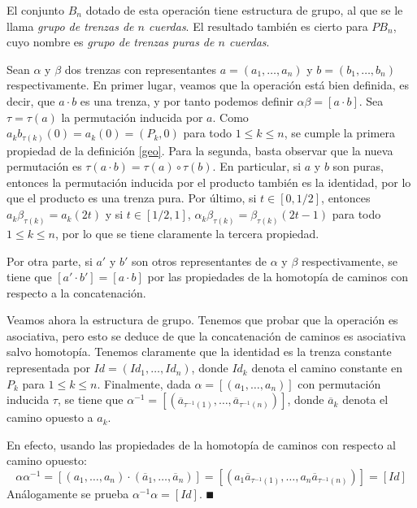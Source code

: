 \documentclass[TFG.tex]{subfiles}
\begin{document}
\begin{prop}
El conjunto $B_n$ dotado de esta operación tiene estructura de grupo, al que se le llama \emph{grupo de trenzas de $n$ cuerdas}. El resultado también es cierto para $PB_n$, cuyo nombre es \emph{grupo de trenzas puras de $n$ cuerdas}. 
\end{prop}

\begin{dem}
Sean $\alpha$ y $\beta$ dos trenzas con representantes $a=(a_1,\dots, a_n)$ y $b=(b_1,\dots, b_n)$ respectivamente. En primer lugar, veamos que la operación está bien definida, es decir, que $a\cdot b$ es una trenza, y por tanto podemos definir $\alpha\beta=[a\cdot b]$. Sea $\tau=\tau(a)$ la permutación inducida por $a$. Como $a_kb_{\tau(k)}(0)=a_k(0)=(P_k,0)$ para todo $1\leq k\leq n$, se cumple la primera propiedad de la definición \ref{geo}. Para la segunda, basta observar que la nueva permutación es $\tau(a\cdot b)=\tau(a)\circ \tau(b)$. En particular, si $a$ y $b$ son puras, entonces la permutación inducida por el producto también es la identidad, por lo que el producto es una trenza pura. Por último, si $t\in[0,1/2]$, entonces $a_k\beta_{\tau(k)}=a_k(2t)$ y si $t\in [1/2,1]$, $\alpha_k\beta_{\tau(k)}=\beta_{\tau(k)}(2t-1)$ para todo $1\leq k\leq n$, por lo que se tiene claramente la tercera propiedad. 

Por otra parte, si $a'$ y $b'$ son otros representantes de $\alpha$ y $\beta$ respectivamente, se tiene que $[a'\cdot b']=[a\cdot b]$ por las propiedades de la homotopía de caminos con respecto a la concatenación.

Veamos ahora la estructura de grupo. Tenemos que probar que la operación es asociativa, pero esto se deduce de que la concatenación de caminos es asociativa salvo homotopía.
Tenemos claramente que la identidad es la trenza constante representada por $Id=(Id_1,\dots, Id_n)$, donde $Id_k$ denota el camino constante en $P_k$ para $1\leq k\leq n$.
Finalmente, dada $\alpha=[(a_1,\dots, a_n)]$ con permutación inducida $\tau$, se tiene que $\alpha^{-1}=[(\overline{a}_{\tau^{-1}(1)},\dots, \overline{a}_{\tau^{-1}(n)})]$, donde $\overline{a}_k$ denota el camino opuesto a $a_k$. 

En efecto, usando las propiedades de la homotopía de caminos con respecto al camino opuesto:
\[
\alpha\alpha^{-1}=[(a_1,\dots, a_n)\cdot (\overline{a}_1,\dots, \overline{a}_n)]=[(a_1\overline{a}_{\tau^{-1}(1)},\dots, a_n\overline{a}_{\tau^{-1}(n)})]=[Id]
\]
Análogamente se prueba $\alpha^{-1}\alpha=[Id]$. 
$\QED$
\end{dem}
\end{document}
